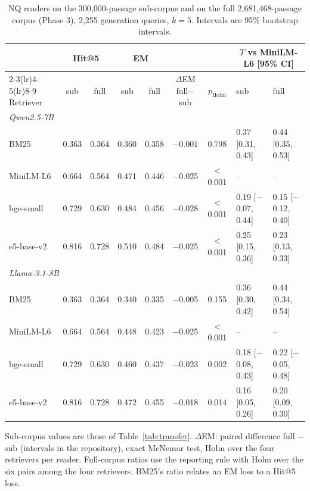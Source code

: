 \begin{table}[t]
\centering
\footnotesize
\caption{NQ readers on the 300,000-passage sub-corpus and on the full 2,681,468-passage corpus (Phase 3), 2,255 generation queries, $k=5$. Intervals are 95\% bootstrap intervals.}
\label{tab:fullreader}
\begin{tabular}{lccccccll}
\toprule
& \multicolumn{2}{c}{Hit@5} & \multicolumn{2}{c}{EM} & & & \multicolumn{2}{c}{$T$ vs MiniLM-L6 [95\% CI]} \\ \cmidrule(lr){2-3}\cmidrule(lr){4-5}\cmidrule(lr){8-9} Retriever & sub & full & sub & full & $\Delta$EM full$-$sub & $p_\text{Holm}$ & sub & full \\
\midrule
\multicolumn{9}{l}{\textit{Qwen2.5-7B}} \\
BM25 & 0.363 & 0.364 & 0.360 & 0.358 & \ensuremath{-}0.001 & 0.798 & 0.37 [0.31, 0.43] & 0.44 [0.35, 0.53] \\
MiniLM-L6 & 0.664 & 0.564 & 0.471 & 0.446 & \ensuremath{-}0.025 & $<$0.001 & -- & -- \\
bge-small & 0.729 & 0.630 & 0.484 & 0.456 & \ensuremath{-}0.028 & $<$0.001 & 0.19 [\ensuremath{-}0.07, 0.44] & 0.15 [\ensuremath{-}0.12, 0.40] \\
e5-base-v2 & 0.816 & 0.728 & 0.510 & 0.484 & \ensuremath{-}0.025 & $<$0.001 & 0.25 [0.15, 0.36] & 0.23 [0.13, 0.33] \\
\midrule
\multicolumn{9}{l}{\textit{Llama-3.1-8B}} \\
BM25 & 0.363 & 0.364 & 0.340 & 0.335 & \ensuremath{-}0.005 & 0.155 & 0.36 [0.30, 0.42] & 0.44 [0.34, 0.54] \\
MiniLM-L6 & 0.664 & 0.564 & 0.448 & 0.423 & \ensuremath{-}0.025 & $<$0.001 & -- & -- \\
bge-small & 0.729 & 0.630 & 0.460 & 0.437 & \ensuremath{-}0.023 & 0.002 & 0.18 [\ensuremath{-}0.08, 0.43] & 0.22 [\ensuremath{-}0.05, 0.48] \\
e5-base-v2 & 0.816 & 0.728 & 0.472 & 0.455 & \ensuremath{-}0.018 & 0.014 & 0.16 [0.05, 0.26] & 0.20 [0.09, 0.30] \\
\bottomrule
\end{tabular}
\par\smallskip\parbox{\linewidth}{\footnotesize Sub-corpus values are those of Table~\ref{tab:transfer}. $\Delta$EM: paired difference full $-$ sub (intervals in the repository), exact McNemar test, Holm over the four retrievers per reader. Full-corpus ratios use the reporting rule with Holm over the six pairs among the four retrievers. BM25's ratio relates an EM loss to a Hit@5 loss.}
\end{table}
